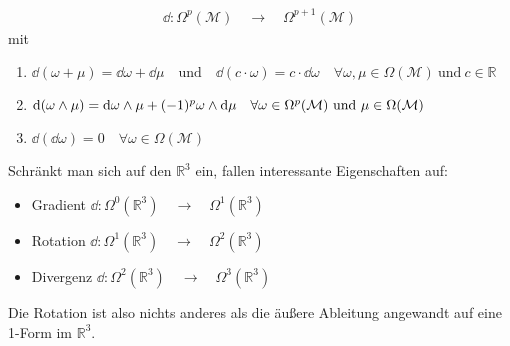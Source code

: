 \begin{align*}
\dd: \Omega^p(\mathcal{M}) \quad \rightarrow \quad  \Omega^{p+1}(\mathcal{M})
\end{align*}
\centering mit
\begin{enumerate}
\item $\dd(\omega + \mu) = \dd\omega + \dd\mu \quad \text{und} \quad \dd(c\cdot\omega) = c\cdot\dd\omega \quad \forall \omega, \mu \in \Omega(\mathcal{M}) \ \text{und} \ c \in \mathbb{R} $
\item $\dd(\omega \wedge \mu) = \dd \omega \wedge \mu + (-1)^p \omega \wedge \dd\mu \quad \forall \omega \in \Omega^p(\mathcal{M}) \ \text{und} \ \mu \in \Omega(\mathcal{M})$
\item $\dd(\dd \omega) = 0 \quad \forall \omega \in \Omega(\mathcal{M}) $
\end{enumerate}
\flushleft
Schränkt man sich auf den $\mathbb{R}^3$ ein, fallen interessante Eigenschaften auf:
\begin{itemize}
\bfseries
\item Gradient $\dd: \Omega^0(\mathbb{R}^3) \quad \rightarrow \quad  \Omega^1(\mathbb{R}^3)$
\item Rotation $\dd: \Omega^1(\mathbb{R}^3) \quad \rightarrow \quad  \Omega^2(\mathbb{R}^3)$
\item Divergenz $\dd: \Omega^2(\mathbb{R}^3) \quad \rightarrow \quad  \Omega^3(\mathbb{R}^3)$
\end{itemize}
\normalfont
Die Rotation ist also nichts anderes als die äußere Ableitung angewandt auf eine 1-Form im $\mathbb{R}^3.$